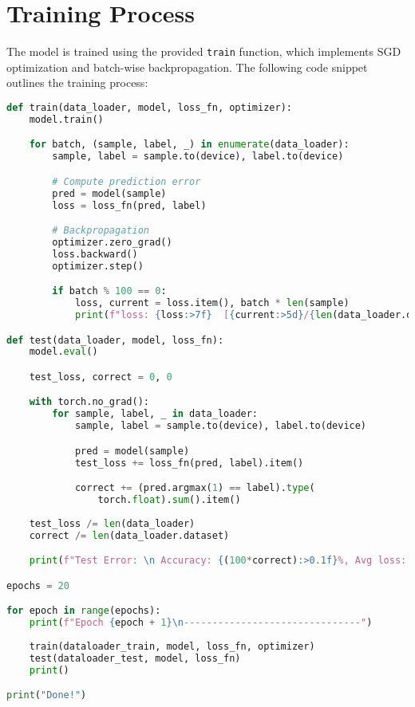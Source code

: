 \section{Training Process}

The model is trained using the provided \texttt{train} function, which implements \ac{SGD} optimization and batch-wise backpropagation. The following code snippet outlines the training process:

\begin{lstlisting}[language=Python, caption={Training process for sound classification}]
def train(data_loader, model, loss_fn, optimizer):
    model.train()

    for batch, (sample, label, _) in enumerate(data_loader):
        sample, label = sample.to(device), label.to(device)

        # Compute prediction error
        pred = model(sample)
        loss = loss_fn(pred, label)

        # Backpropagation
        optimizer.zero_grad()
        loss.backward()
        optimizer.step()

        if batch % 100 == 0:
            loss, current = loss.item(), batch * len(sample)
            print(f"loss: {loss:>7f}  [{current:>5d}/{len(data_loader.dataset):>5d}]")

def test(data_loader, model, loss_fn):
    model.eval()

    test_loss, correct = 0, 0

    with torch.no_grad():
        for sample, label, _ in data_loader:
            sample, label = sample.to(device), label.to(device)

            pred = model(sample)
            test_loss += loss_fn(pred, label).item()

            correct += (pred.argmax(1) == label).type(
                torch.float).sum().item()
            
    test_loss /= len(data_loader)
    correct /= len(data_loader.dataset)

    print(f"Test Error: \n Accuracy: {(100*correct):>0.1f}%, Avg loss: {test_loss:>8f} \n")

epochs = 20

for epoch in range(epochs):
    print(f"Epoch {epoch + 1}\n-------------------------------")
    
    train(dataloader_train, model, loss_fn, optimizer)
    test(dataloader_test, model, loss_fn)
    print()

print("Done!")
\end{lstlisting}